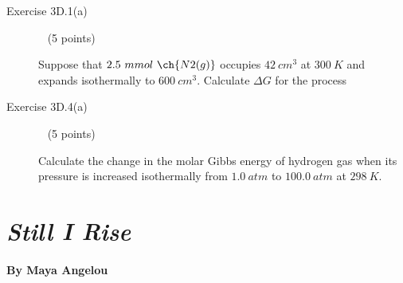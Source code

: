 \documentclass[12pt, openany, letterpaper]{memoir}
\begin{document}
\begin{description}
	\vspace{20em}
	
	\item [Exercise 3D.1(a)] ~ (5 points)
	
	Suppose that $2.5~mmol~\ch{N2(g)}$ occupies $42~cm^3$ at $300~K$ and expands isothermally to $600~cm^3$. Calculate $\Delta G$ for the process
	
	\vspace{12em}
	\item [Exercise 3D.4(a)] ~ (5 points)
	
	Calculate the change in the molar Gibbs energy of hydrogen gas when its pressure is increased isothermally from $1.0~atm$ to $100.0~atm$ at $298~K$.
	

\end{description}

\newpage
\pagestyle{empty}
\addtocounter{page}{-1}
\section*{\emph{Still I Rise}}
\paragraph{By Maya Angelou}~
\end{document}
